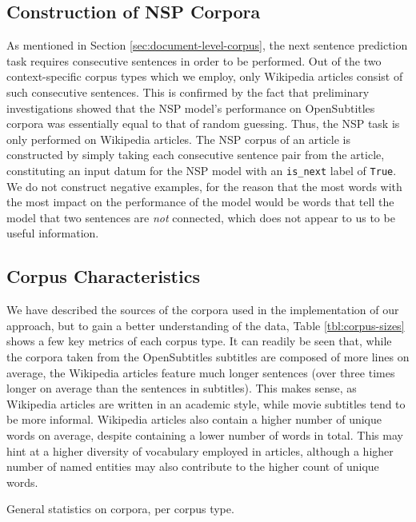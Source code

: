 \subsection{Construction of NSP Corpora}
As mentioned in Section \ref{sec:document-level-corpus}, the next sentence prediction task requires consecutive sentences in order to be performed.
Out of the two context-specific corpus types which we employ, only Wikipedia articles consist of such consecutive sentences.
This is confirmed by the fact that preliminary investigations showed that the NSP model's performance on OpenSubtitles corpora was essentially equal to that of random guessing.
Thus, the NSP task is only performed on Wikipedia articles.
The NSP corpus of an article is constructed by simply taking each consecutive sentence pair from the article, constituting an input datum for the NSP model with an \texttt{is\_next} label of \texttt{True}.
We do not construct negative examples, for the reason that the most words with the most impact on the performance of the model would be words that tell the model that two sentences are \textit{not} connected, which does not appear to us to be useful information.

\subsection{Corpus Characteristics}
We have described the sources of the corpora used in the implementation of our approach, but to gain a better understanding of the data, Table \ref{tbl:corpus-sizes} shows a few key metrics of each corpus type.
It can readily be seen that, while the corpora taken from the OpenSubtitles subtitles are composed of more lines on average, the Wikipedia articles feature much longer sentences (over three times longer on average than the sentences in subtitles).
This makes sense, as Wikipedia articles are written in an academic style, while movie subtitles tend to be more informal.
Wikipedia articles also contain a higher number of unique words on average, despite containing a lower number of words in total.
This may hint at a higher diversity of vocabulary employed in articles, although a higher number of named entities may also contribute to the higher count of unique words.

\begin{table}[ht]
	\centering
	
	\caption{General statistics on corpora, per corpus type.}
	\label{tbl:corpus-sizes}
\end{table}


